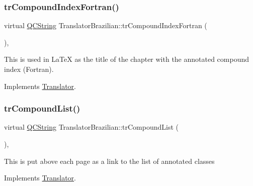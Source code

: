\mbox{\label{class_translator_brazilian_a57babaeb530778fe1737808bd62ea761}} 
\subsubsection{\texorpdfstring{trCompoundIndexFortran()}{trCompoundIndexFortran()}}
{\footnotesize\ttfamily virtual \mbox{\hyperlink{class_q_c_string}{Q\+C\+String}} Translator\+Brazilian\+::tr\+Compound\+Index\+Fortran (\begin{DoxyParamCaption}{ }\end{DoxyParamCaption})\hspace{0.3cm}{\ttfamily [inline]}, {\ttfamily [virtual]}}

This is used in La\+TeX as the title of the chapter with the annotated compound index (Fortran). 

Implements \mbox{\hyperlink{class_translator}{Translator}}.

\mbox{\label{class_translator_brazilian_a511668900f31596e786f21de031de960}} 
\subsubsection{\texorpdfstring{trCompoundList()}{trCompoundList()}}
{\footnotesize\ttfamily virtual \mbox{\hyperlink{class_q_c_string}{Q\+C\+String}} Translator\+Brazilian\+::tr\+Compound\+List (\begin{DoxyParamCaption}{ }\end{DoxyParamCaption})\hspace{0.3cm}{\ttfamily [inline]}, {\ttfamily [virtual]}}

This is put above each page as a link to the list of annotated classes 

Implements \mbox{\hyperlink{class_translator}{Translator}}.

\mbox{\label{class_translator_brazilian_a8f98595852f02f145498e832193900a4}} 
